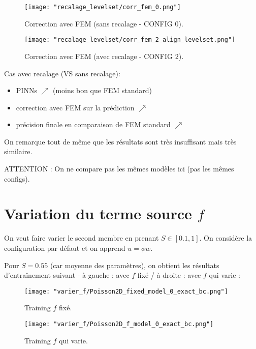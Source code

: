 \begin{minipage}{0.48\linewidth}
	\begin{figure}[H]
		\centering
		\texttt{[image: "recalage\_levelset/corr\_fem\_0.png"]}
		\caption{Correction avec FEM (sans recalage - CONFIG 0).}
	\end{figure}
\end{minipage}
\begin{minipage}{0.48\linewidth}
	\begin{figure}[H]
		\centering
		\texttt{[image: "recalage\_levelset/corr\_fem\_2\_align\_levelset.png"]}
		\caption{Correction avec FEM (avec recalage - CONFIG 2).}
	\end{figure}
\end{minipage}

\begin{Obs}
	Cas avec recalage (VS sans recalage):
	\begin{itemize}
		\item PINNs $\nearrow$ (moins bon que FEM standard)
		\item correction avec FEM sur la prédiction $\nearrow$
		\item précision finale en comparaison de FEM standard $\nearrow$
	\end{itemize}
	
	On remarque tout de même que les résultats sont très insuffisant mais très similaire.
	
	ATTENTION : On ne compare pas les mêmes modèles ici (pas les mêmes configs).
\end{Obs}

\section{Variation du terme source $f$}

On veut faire varier le second membre en prenant $S\in[0.1,1]$. On considère la configuration par défaut et on apprend $u=\phi w$.

Pour $S=0.55$ (car moyenne des paramètres), on obtient les résultats d'entraînement suivant - à gauche : avec $f$ fixé / à droite : avec $f$ qui varie :

\begin{minipage}{0.48\linewidth}
	\begin{figure}[H]
		\centering
		\texttt{[image: "varier\_f/Poisson2D\_fixed\_model\_0\_exact\_bc.png"]}
		\caption{Training $f$ fixé.}
	\end{figure}
\end{minipage}
\begin{minipage}{0.48\linewidth}
	\begin{figure}[H]
		\centering
		\texttt{[image: "varier\_f/Poisson2D\_f\_model\_0\_exact\_bc.png"]}
		\caption{Training $f$ qui varie.}
	\end{figure}
\end{minipage}

